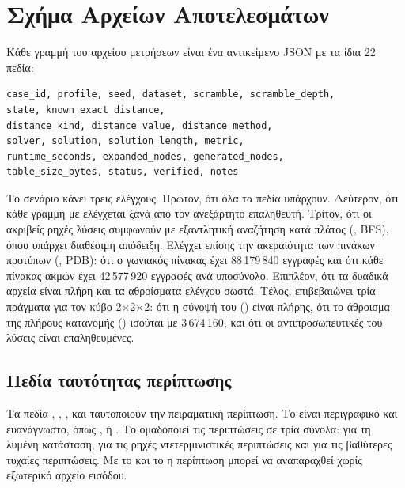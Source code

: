 \chapter{Σχήμα Αρχείων Αποτελεσμάτων}
\label{app:schema}

Κάθε γραμμή του αρχείου μετρήσεων  είναι ένα αντικείμενο JSON με τα ίδια 22 πεδία:

\begin{verbatim}
case_id, profile, seed, dataset, scramble, scramble_depth,
state, known_exact_distance,
distance_kind, distance_value, distance_method,
solver, solution, solution_length, metric,
runtime_seconds, expanded_nodes, generated_nodes,
table_size_bytes, status, verified, notes
\end{verbatim}

Το σενάριο  κάνει τρεις ελέγχους. Πρώτον, ότι όλα τα πεδία υπάρχουν. Δεύτερον, ότι κάθε γραμμή με  ελέγχεται ξανά από τον ανεξάρτητο επαληθευτή. Τρίτον, ότι οι ακριβείς ρηχές λύσεις συμφωνούν με εξαντλητική αναζήτηση κατά πλάτος (, BFS), όπου υπάρχει διαθέσιμη απόδειξη. Ελέγχει επίσης την ακεραιότητα των πινάκων προτύπων (, PDB): ότι ο γωνιακός πίνακας έχει 88\,179\,840 εγγραφές και ότι κάθε πίνακας ακμών έχει 42\,577\,920 εγγραφές ανά υποσύνολο. Επιπλέον, ότι τα δυαδικά αρχεία είναι πλήρη και τα αθροίσματα ελέγχου σωστά. Τέλος, επιβεβαιώνει τρία πράγματα για τον κύβο 2×2×2: ότι η σύνοψή του () είναι πλήρης, ότι το άθροισμα της πλήρους κατανομής () ισούται με 3\,674\,160, και ότι οι αντιπροσωπευτικές του λύσεις είναι επαληθευμένες.

\section{Πεδία ταυτότητας περίπτωσης}
\label{sec:schema-identity}
Τα πεδία , , ,  και  ταυτοποιούν την πειραματική περίπτωση. Το  είναι περιγραφικό και ευανάγνωστο, όπως ,  ή . Το  ομαδοποιεί τις περιπτώσεις σε τρία σύνολα:  για τη λυμένη κατάσταση,  για τις ρηχές ντετερμινιστικές περιπτώσεις και  για τις βαθύτερες τυχαίες περιπτώσεις. Με το  και το  η περίπτωση μπορεί να αναπαραχθεί χωρίς εξωτερικό αρχείο εισόδου.

